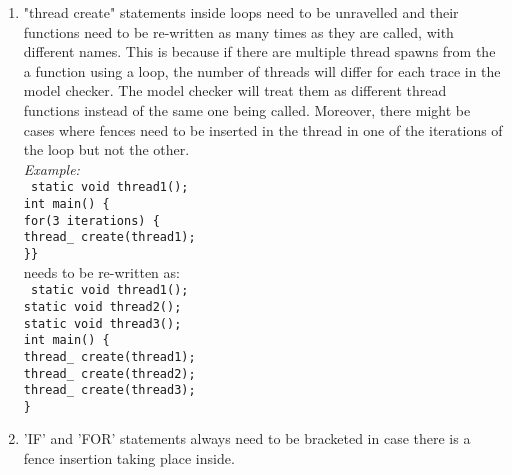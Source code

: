 \begin{enumerate}
	\item "thread create" statements inside loops need to be unravelled and their functions need to be re-written as many times as they are called, with different names. This is because if there are multiple thread spawns from the a function using a loop, the number of threads will differ for each trace in the model checker. The model checker will treat them as different thread functions instead of the same one being called. Moreover, there might be cases where fences need to be inserted in the thread in one of the iterations of the loop but not the other.\\
	\textit{Example:}\\ \texttt{%
	static void thread1();\\
	int main() \{\\
	\hspace{10mm} for(3 iterations) \{\\
	thread\_ create(thread1);\\
	\}\}%
	}\\ needs to be re-written as:\\
	\texttt{%
	static void thread1();\\
	static void thread2();\\
	static void thread3();\\
	int main() \{\\
	thread\_ create(thread1);\\
	thread\_ create(thread2);\\
	thread\_ create(thread3);\\
	\}%
	}
	
	\item 'IF' and 'FOR' statements always need to be bracketed in case there is a fence insertion taking place inside.
\end{enumerate}

